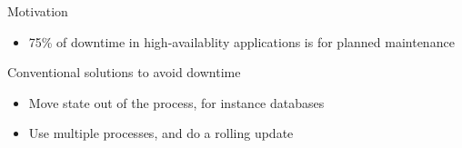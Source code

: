 \begin{frame}{Motivation}%
\begin{itemize}
\item 75\% of downtime in high-availablity applications is for planned
maintenance
\end{itemize}
\end{frame}

\begin{frame}{Conventional solutions to avoid downtime}%
\begin{itemize}
\item Move state out of the process, for instance databases
\item Use multiple processes, and do a rolling update
\end{itemize}

\end{frame}

